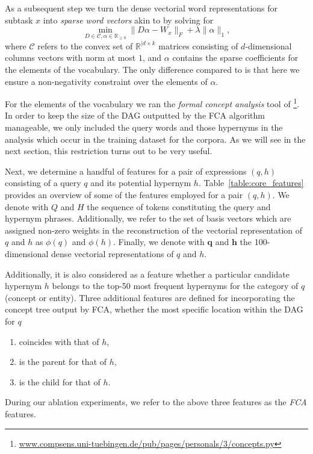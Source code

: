 \documentclass[11pt,a4paper]{article}
\begin{document}
As a subsequent step we turn the dense vectorial word representations for subtask $x$ into
\emph{sparse word vectors} akin to \citet{Berend:2017} by solving for
\begin{equation}
\min\limits_{D \in \mathcal{C}, \alpha \in \mathbb{R}_{\geq0}} \lVert D\alpha - W_{x} \rVert_F + \lambda \lVert \alpha \rVert_1,
\label{nonneg_SPAMS_objective}
\end{equation}
where $\mathcal{C}$ refers to the convex set of $\mathbb{R}^{\lvert d \times k}$ matrices consisting of $d$-dimensional columns vectors
with norm at most $1$, and $\alpha$ contains the sparse coefficients for the elements of the vocabulary. The only difference
compared to \citet{Berend:2017} is that here we ensure a non-negativity
constraint over the elements of $\alpha$.

For the elements of the vocabulary we ran the \emph{formal concept analysis} tool of
\citet{Endres:2010}\footnote{\url{www.compsens.uni-tuebingen.de/pub/pages/personals/3/concepts.py}}. In order to keep the size of the DAG outputted by the FCA algorithm manageable, we only included the query words and those hypernyms in the analysis which occur in the training dataset for the corpora.
As we will see in the next section, this restriction turns out to be very useful.

Next, we determine a handful of features for a pair of expressions $(q, h)$
consisting of a query $q$ and its potential hypernym $h$. 
Table~\ref{table:core_features} provides an overview of some of the features employed for a pair $(q, h)$. 
We denote with $Q$
and $H$ the sequence of tokens constituting the query and hypernym phrases.
Additionally, we refer to the set of basis vectors which are assigned non-zero weights in the reconstruction of the vectorial representation of $q$ and $h$ as $\phi(q)$ and $\phi(h)$. Finally, we denote with $\mathbf{q}$ and $\mathbf{h}$ the 100-dimensional dense vectorial representations of $q$ and $h$.

Additionally, it is also considered as a feature whether a
particular candidate hypernym $h$ belongs to the top-50 most frequent hypernyms
for the category of $q$ (concept or entity).
Three additional features are defined for incorporating the concept tree output
by FCA, whether the most specific location within the DAG for $q$
\begin{enumerate}
	\item coincides with that of $h$,
	\item is the parent for that of $h$,
	\item is the child for that of $h$.
\end{enumerate}
During our ablation experiments, we refer to the above three features as the \emph{FCA} features.
\end{document}
